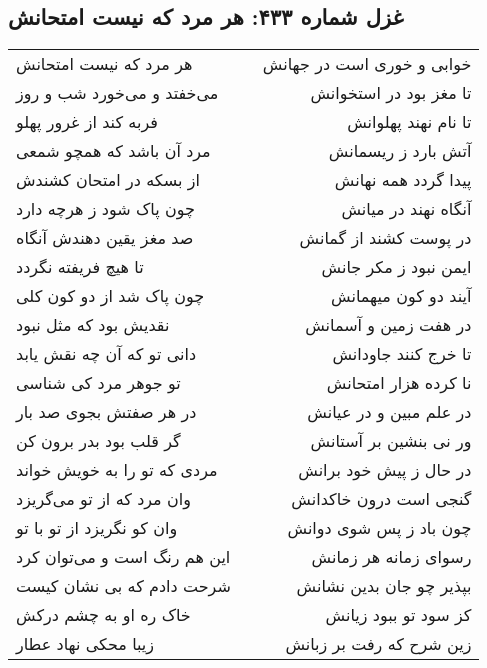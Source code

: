\begin{center}
\section*{غزل شماره ۴۳۳: هر مرد که نیست امتحانش}
\label{sec:433}
\begin{longtable}{l p{0.5cm} r}
هر مرد که نیست امتحانش
&&
خوابی و خوری است در جهانش
\\
می‌خفتد و می‌خورد شب و روز
&&
تا مغز بود در استخوانش
\\
فربه کند از غرور پهلو
&&
تا نام نهند پهلوانش
\\
مرد آن باشد که همچو شمعی
&&
آتش بارد ز ریسمانش
\\
از بسکه در امتحان کشندش
&&
پیدا گردد همه نهانش
\\
چون پاک شود ز هرچه دارد
&&
آنگاه نهند در میانش
\\
صد مغز یقین دهندش آنگاه
&&
در پوست کشند از گمانش
\\
تا هیچ فریفته نگردد
&&
ایمن نبود ز مکر جانش
\\
چون پاک شد از دو کون کلی
&&
آیند دو کون میهمانش
\\
نقدیش بود که مثل نبود
&&
در هفت زمین و آسمانش
\\
دانی تو که آن چه نقش یابد
&&
تا خرج کنند جاودانش
\\
تو جوهر مرد کی شناسی
&&
نا کرده هزار امتحانش
\\
در هر صفتش بجوی صد بار
&&
در علم مبین و در عیانش
\\
گر قلب بود بدر برون کن
&&
ور نی بنشین بر آستانش
\\
مردی که تو را به خویش خواند
&&
در حال ز پیش خود برانش
\\
وان مرد که از تو می‌گریزد
&&
گنجی است درون خاکدانش
\\
وان کو نگریزد از تو با تو
&&
چون باد ز پس شوی دوانش
\\
این هم رنگ است و می‌توان کرد
&&
رسوای زمانه هر زمانش
\\
شرحت دادم که بی نشان کیست
&&
بپذیر چو جان بدین نشانش
\\
خاک ره او به چشم درکش
&&
کز سود تو ببود زیانش
\\
زیبا محکی نهاد عطار
&&
زین شرح که رفت بر زبانش
\\
\end{longtable}
\end{center}
